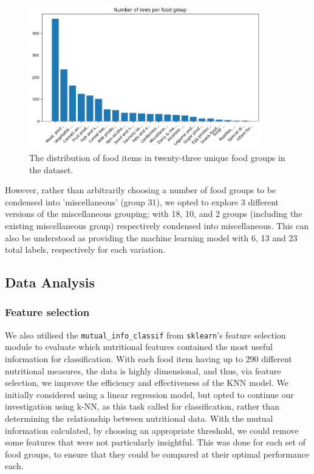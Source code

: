 \documentclass[11pt]{article}
\begin{document}
\begin{figure}[htbp]
    \centering
    \includegraphics[width=0.9\textwidth]{report/figs/number-of-rows-per-food-group.png}
    \caption{The distribution of food items in twenty-three unique food groups in the \cite{FoodStandardsAustraliaNewZealand} dataset.}
    \label{fig:food-group-distribution}
\end{figure}

However, rather than arbitrarily choosing a number of food groups to be condensed into 'miscellaneous' (group 31), we opted to explore 3 different versions of the miscellaneous grouping; with 18, 10, and 2 groups (including the existing miscellaneous group) respectively condensed into miscellaneous. This can also be understood as providing the machine learning model with 6, 13 and 23 total labels, respectively for each variation.

\subsection{Data Analysis}
\subsubsection{Feature selection}

We also utilised the \verb|mutual_info_classif| from \verb|sklearn|'s feature selection module to evaluate which nutritional features contained the most useful information for classification. With each food item having up to 290 different nutritional measures, the data is highly dimensional, and thus, via feature selection, we improve the efficiency and effectiveness of the KNN model. We initially considered using a linear regression model, but opted to continue our investigation using k-NN, as this task called for classification, rather than determining the relationship between nutritional data. With the mutual information calculated, by choosing an appropriate threshold, we could remove some features that were not particularly insightful. This was done for each set of food groups, to ensure that they could be compared at their optimal performance each. 
\end{document}
